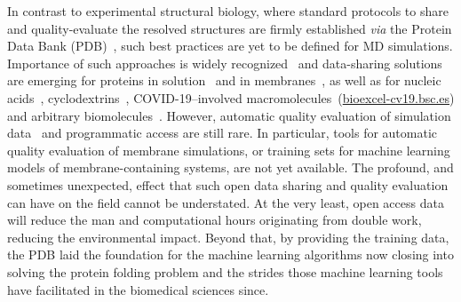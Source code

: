 \documentclass[fleqn,10pt]{wlscirep}
\begin{document}
In contrast to experimental structural biology, where standard protocols to share and quality-evaluate the resolved structures are firmly established \textit{via} the Protein Data Bank (PDB)~\cite{montelione13}, such best practices are yet to be defined for MD simulations. Importance of such approaches is widely recognized~\cite{feig99,tai04,silva06,abraham19,hildebrand19,hospital20,abriata20,espigares20} and data-sharing solutions are emerging for proteins in solution~\cite{meyer10,kamp10} and in membranes~\cite{newport19,espigares20,leston22}, as well as for nucleic acids~\cite{hospital16}, cyclodextrins~\cite{mixcoha16}, COVID-19--involved macromolecules~(\url{bioexcel-cv19.bsc.es}) and arbitrary biomolecules~\cite{bekker20}. However,
automatic quality evaluation of simulation data~\cite{meyer10,hospital16} and programmatic access are still rare. 
In particular, tools for automatic quality evaluation of membrane simulations, or training sets for machine learning models of membrane-containing systems, are not yet available. The profound, and sometimes unexpected, effect that such open data sharing and quality evaluation can have on the field cannot be understated. At the very least, open access data will reduce the man and computational hours originating from double work, reducing the environmental impact. Beyond that, by providing the training data, the PDB laid the foundation for the machine learning algorithms now closing into solving the protein folding problem and the strides those machine learning tools have facilitated in the biomedical sciences since. 

\end{document}
